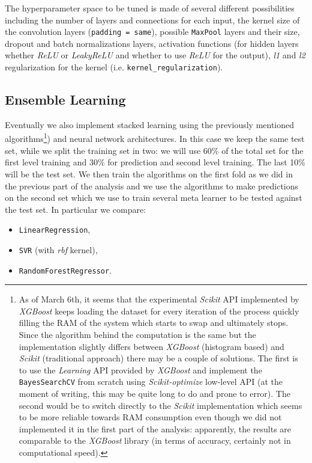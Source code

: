     The hyperparameter space to be tuned is made of several different possibilities including the number of layers and connections for each input, the kernel size of the convolution layers (\texttt{padding = same}), possible \texttt{MaxPool} layers and their size, dropout and batch normalizations layers, activation functions (for hidden layers whether \textit{ReLU} or \textit{LeakyReLU} and whether to use \textit{ReLU} for the output), \textit{l1} and \textit{l2} regularization for the kernel (i.e. \texttt{kernel\_regularization}). 
    
\subsection{Ensemble Learning}\label{sec:ensemble_desc}
    Eventually we also implement stacked learning using the previously mentioned algorithms\footnote{As of March 6th, it seems that the experimental \textit{Scikit} API implemented by \textit{XGBoost} keeps loading the dataset for every iteration of the process quickly filling the RAM of the system which starts to swap and ultimately stops. Since the algorithm behind the computation is the same but the implementation slightly differs between \textit{XGBoost} (histogram based) and \textit{Scikit} (traditional approach) there may be a couple of solutions. The first is to use the \textit{Learning} API provided by \textit{XGBoost} and implement the \texttt{BayesSearchCV} from scratch using \textit{Scikit-optimize} low-level API (at the moment of writing, this may be quite long to do and prone to error). The second would be to switch directly to the \textit{Scikit} implementation which seems to be more reliable towards RAM consumption even though we did not implemented it in the first part of the analysis: apparently, the results are comparable to the \textit{XGBoost} library (in terms of accuracy, certainly not in computational speed).}) and neural network architectures. In this case we keep the same test set, while we split the training set in two: we will use 60\% of the total set for the first level training and 30\% for prediction and second level training. The last 10\% will be the test set. We then train the algorithms on the first fold as we did in the previous part of the analysis and we use the algorithms to make predictions on the second set which we use to train several meta learner to be tested against the test set. In particular we compare:
    \begin{itemize}
        \item \texttt{LinearRegression},
        \item \texttt{SVR} (with \textit{rbf} kernel),
        \item \texttt{RandomForestRegressor}.
    \end{itemize}
